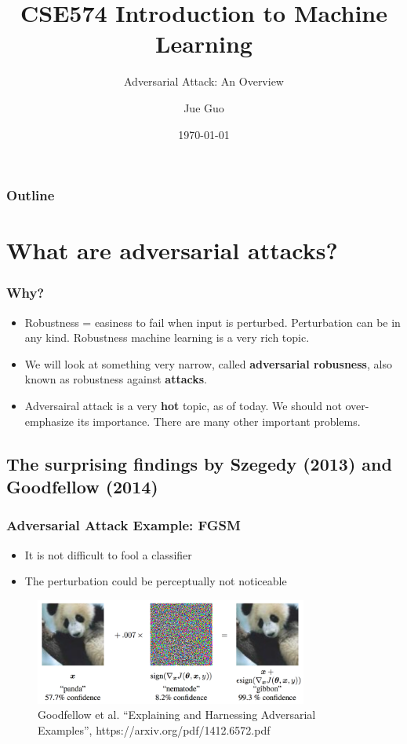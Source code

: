 \documentclass[8pt,dvipsnames]{beamer}
\title{CSE574 Introduction to Machine Learning}
\subtitle{Adversarial Attack: An Overview}
\author{Jue Guo}
\institute{University at Buffalo}
\date{\today}
\begin{document}
\begin{frame}
    \titlepage
\end{frame}
\begin{frame}
    \frametitle{Outline}
    \tableofcontents
\end{frame}

\section{What are adversarial attacks?}
\begin{frame}
    \frametitle{Why?}
    \begin{itemize}
        \item Robustness = easiness to fail when input is perturbed. Perturbation can be in any kind. Robustness machine learning is a very rich topic.
        \item We will look at something very narrow, called \textbf{adversarial robusness}, also known as robustness against \textbf{attacks}.
        \item Adversairal attack is a very \textbf{hot} topic, as of today. We should not over-emphasize its importance. There are many other important problems.
    \end{itemize}
\end{frame}

\subsection{The surprising findings by Szegedy (2013) and Goodfellow (2014)}
\begin{frame}
    \frametitle{Adversarial Attack Example: FGSM}
    \begin{itemize}
        \item It is not difficult to fool a classifier
        \item The perturbation could be perceptually not noticeable
    \end{itemize}
    \begin{figure}[ht]
        \centering
        \includegraphics[width=0.8\textwidth]{imgs/adv_overview_1.png}
        \caption{Goodfellow et al. “Explaining and Harnessing Adversarial Examples”, https://arxiv.org/pdf/1412.6572.pdf}
    \end{figure}
\end{frame}
\end{document}
